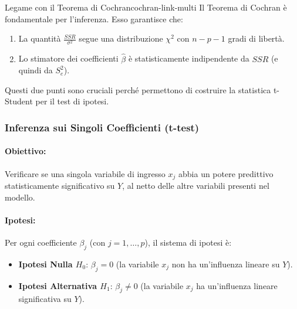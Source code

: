 \begin{nota}{Legame con il Teorema di Cochran}{cochran-link-multi}
Il Teorema di Cochran è fondamentale per l'inferenza. Esso garantisce che:
\begin{enumerate}
    \item La quantità \( \frac{SSR}{\sigma^2} \) segue una distribuzione \(\chi^2\) con \(n-p-1\) gradi di libertà.
    \item Lo stimatore dei coefficienti \(\hat{\beta}\) è statisticamente indipendente da \(SSR\) (e quindi da \(S_e^2\)).
\end{enumerate}
Questi due punti sono cruciali perché permettono di costruire la statistica t-Student per il test di ipotesi.
\end{nota}

\subsubsection{Inferenza sui Singoli Coefficienti (t-test)}

\paragraph{Obiettivo:} Verificare se una singola variabile di ingresso \(x_j\) abbia un potere predittivo statisticamente significativo su \(Y\), al netto delle altre variabili presenti nel modello.

\paragraph{Ipotesi:} Per ogni coefficiente \(\beta_j\) (con \(j=1, \dots, p\)), il sistema di ipotesi è:
\begin{itemize}
    \item \textbf{Ipotesi Nulla $H_0$}: $\beta_j = 0$ (la variabile \(x_j\) non ha un'influenza lineare su \(Y\)).
    \item \textbf{Ipotesi Alternativa $H_1$}: $\beta_j \neq 0$ (la variabile \(x_j\) ha un'influenza lineare significativa su \(Y\)).
\end{itemize}

